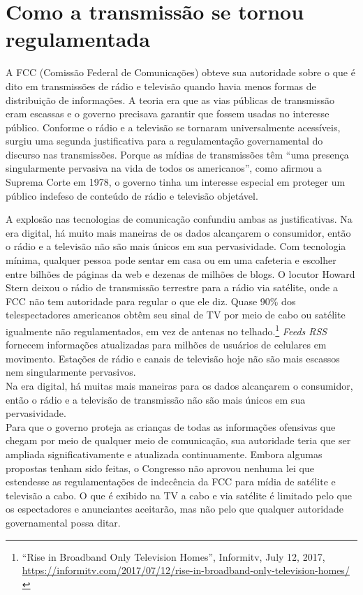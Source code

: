 \documentclass{book}
\newcommand{\ingles}[1]{\textit{#1}}
\begin{document}
\section{Como a transmissão se tornou regulamentada}
\label{cap8:os-como}
A FCC (Comissão Federal de Comunicações) obteve sua autoridade sobre o que é
dito em transmissões de rádio e televisão quando havia menos formas de
distribuição de informações. A teoria era que as vias públicas de transmissão
eram escassas e o governo precisava garantir que fossem usadas no interesse
público. Conforme o rádio e a televisão se tornaram universalmente acessíveis,
surgiu uma segunda justificativa para a regulamentação governamental do discurso
nas transmissões. Porque as mídias de transmissões têm ``uma presença
singularmente pervasiva na vida de todos os americanos'', como afirmou a Suprema
Corte em 1978, o governo tinha um interesse especial em proteger um público
indefeso de conteúdo de rádio e televisão objetável.

A explosão nas tecnologias de comunicação confundiu ambas as justificativas. Na
era digital, há muito mais maneiras de os dados alcançarem o consumidor, então o
rádio e a televisão não são mais únicos em sua pervasividade. Com tecnologia
mínima, qualquer pessoa pode sentar em casa ou em uma cafeteria e escolher entre
bilhões de páginas da web e dezenas de milhões de blogs. O locutor Howard Stern
deixou o rádio de transmissão terrestre para a rádio via satélite, onde a FCC não tem
autoridade para regular o que ele diz. Quase 90\% dos  telespectadores americanos
obtêm seu sinal de TV por meio de cabo ou satélite igualmente não regulamentados,
em vez de antenas no  telhado.\footnote{``Rise in Broadband Only Television
Homes'', Informitv, July 12, 2017,
\url{https://informitv.com/2017/07/12/rise-in-broadband-only-television-homes/}}
\ingles{Feeds RSS} fornecem informações atualizadas para milhões de usuários de
celulares em movimento. Estações de rádio e canais de televisão hoje não são mais
escassos nem singularmente pervasivos.\\

Na era digital, há muitas mais maneiras para os dados alcançarem o consumidor,
então o rádio e a televisão de transmissão não são mais únicos em sua pervasividade.\\

Para que o governo proteja as crianças de todas as informações ofensivas que
chegam por meio de qualquer meio de comunicação, sua autoridade teria que ser
ampliada significativamente e atualizada continuamente. Embora algumas propostas
tenham sido feitas, o Congresso não aprovou nenhuma lei que estendesse as
regulamentações de indecência da FCC para mídia de satélite e televisão a cabo.
O que é exibido na TV a cabo e via satélite é limitado pelo que os espectadores
e anunciantes aceitarão, mas não pelo que qualquer autoridade governamental
possa ditar.
\end{document}
